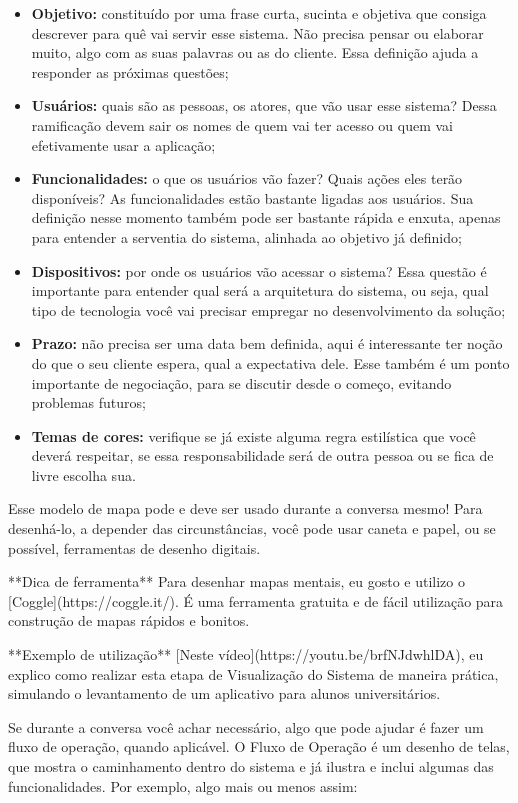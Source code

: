 \begin{itemize}
    \item \textbf{Objetivo:} constituído por uma frase curta, sucinta e objetiva que consiga descrever para quê vai servir esse sistema. Não precisa pensar ou elaborar muito, algo com as suas palavras ou as do cliente. Essa definição ajuda a responder as próximas questões;
    \item \textbf{Usuários:} quais são as pessoas, os atores, que vão usar esse sistema? Dessa ramificação devem sair os nomes de quem vai ter acesso ou quem vai efetivamente usar a aplicação;
    \item \textbf{Funcionalidades:} o que os usuários vão fazer? Quais ações eles terão disponíveis? As funcionalidades estão bastante ligadas aos usuários. Sua definição nesse momento também pode ser bastante rápida e enxuta, apenas para entender a serventia do sistema, alinhada ao objetivo já definido;
    \item \textbf{Dispositivos:} por onde os usuários vão acessar o sistema? Essa questão é importante para entender qual será a arquitetura do sistema, ou seja, qual tipo de tecnologia você vai precisar empregar no desenvolvimento da solução;
    \item \textbf{Prazo:} não precisa ser uma data bem definida, aqui é interessante ter noção do que o seu cliente espera, qual a expectativa dele. Esse também é um ponto importante de negociação, para se discutir desde o começo, evitando problemas futuros;
    \item \textbf{Temas de cores:} verifique se já existe alguma regra estilística que você deverá respeitar, se essa responsabilidade será de outra pessoa ou se fica de livre escolha sua.
\end{itemize}


Esse modelo de mapa pode e deve ser usado durante a conversa mesmo! Para desenhá-lo, a depender das circunstâncias, você pode usar caneta e papel, ou se possível, ferramentas de desenho digitais.

**Dica de ferramenta**
Para desenhar mapas mentais, eu gosto e utilizo o [Coggle](https://coggle.it/). É uma ferramenta gratuita e de fácil utilização para construção de mapas rápidos e bonitos.

**Exemplo de utilização**
[Neste vídeo](https://youtu.be/brfNJdwhlDA), eu explico como realizar esta etapa de Visualização do Sistema de maneira prática, simulando o levantamento de um aplicativo para alunos universitários.

Se durante a conversa você achar necessário, algo que pode ajudar é fazer um fluxo de operação, quando aplicável. O Fluxo de Operação é um desenho de telas, que mostra o caminhamento dentro do sistema e já ilustra e inclui algumas das funcionalidades. Por exemplo, algo mais ou menos assim:


